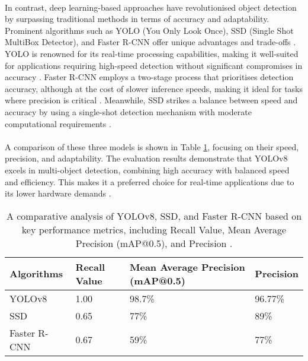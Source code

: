 \paragraph*{} In contrast, deep learning-based approaches have revolutionised object detection by surpassing traditional methods in terms of accuracy and adaptability. Prominent algorithms such as YOLO (You Only Look Once), SSD (Single Shot MultiBox Detector), and Faster R-CNN offer unique advantages and trade-offs \cite{sachan2019object}. YOLO is renowned for its real-time processing capabilities, making it well-suited for applications requiring high-speed detection without significant compromises in accuracy \cite{redmon2016you}. Faster R-CNN employs a two-stage process that prioritises detection accuracy, although at the cost of slower inference speeds, making it ideal for tasks where precision is critical \cite{ren2015faster}. Meanwhile, SSD strikes a balance between speed and accuracy by using a single-shot detection mechanism with moderate computational requirements \cite{liu2016ssd}.

\paragraph*{} A comparison of these three models is shown in Table \ref{tab:performance_metrics}, focusing on their speed, precision, and adaptability. The evaluation results demonstrate that YOLOv8 excels in multi-object detection, combining high accuracy with balanced speed and efficiency. This makes it a preferred choice for real-time applications due to its lower hardware demands \cite{kaliappan2023real}.

\begin{table}[!h]
\centering
\begin{tabular}{| p{3.5cm} | p{3cm} | p{4cm} | p{3.5cm} |}
    \hline
    Algorithms  & Recall Value  & Mean Average Precision (mAP@0.5)  & Precision \\ \hline
    YOLOv8  & 1.00  & 98.7\%  & 96.77\% \\ \hline
    SSD  & 0.65  & 77\%  & 89\% \\ \hline
    Faster R-CNN  & 0.67  & 59\%  & 77\% \\ \hline
\end{tabular}
\caption{A comparative analysis of YOLOv8, SSD, and Faster R-CNN based on key performance metrics, including Recall Value, Mean Average Precision (mAP@0.5), and Precision \cite{kaliappan2023performance}.}
\label{tab:performance_metrics}
\end{table}


